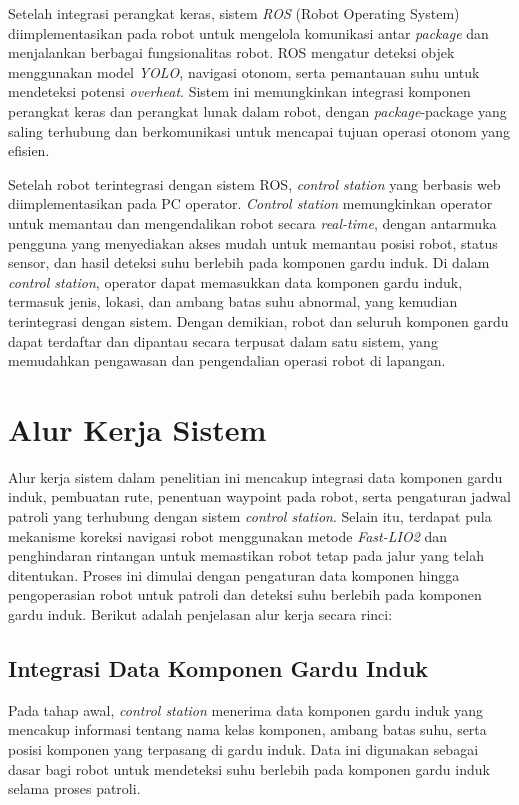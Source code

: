 Setelah integrasi perangkat keras, sistem \emph{ROS} (Robot Operating System) diimplementasikan pada robot untuk mengelola komunikasi antar \textit{package} dan menjalankan berbagai fungsionalitas robot. ROS mengatur deteksi objek menggunakan model \emph{YOLO}, navigasi otonom, serta pemantauan suhu untuk mendeteksi potensi \emph{overheat}. Sistem ini memungkinkan integrasi komponen perangkat keras dan perangkat lunak dalam robot, dengan \emph{package}-package yang saling terhubung dan berkomunikasi untuk mencapai tujuan operasi otonom yang efisien.

Setelah robot terintegrasi dengan sistem ROS, \emph{control station} yang berbasis web diimplementasikan pada PC operator. \emph{Control station} memungkinkan operator untuk memantau dan mengendalikan robot secara \emph{real-time}, dengan antarmuka pengguna yang menyediakan akses mudah untuk memantau posisi robot, status sensor, dan hasil deteksi suhu berlebih pada komponen gardu induk. Di dalam \emph{control station}, operator dapat memasukkan data komponen gardu induk, termasuk jenis, lokasi, dan ambang batas suhu abnormal, yang kemudian terintegrasi dengan sistem. Dengan demikian, robot dan seluruh komponen gardu dapat terdaftar dan dipantau secara terpusat dalam satu sistem, yang memudahkan pengawasan dan pengendalian operasi robot di lapangan.

\section{Alur Kerja Sistem}

Alur kerja sistem dalam penelitian ini mencakup integrasi data komponen gardu induk, pembuatan rute, penentuan waypoint pada robot, serta pengaturan jadwal patroli yang terhubung dengan sistem \emph{control station}. Selain itu, terdapat pula mekanisme koreksi navigasi robot menggunakan metode \emph{Fast-LIO2} dan penghindaran rintangan untuk memastikan robot tetap pada jalur yang telah ditentukan. Proses ini dimulai dengan pengaturan data komponen hingga pengoperasian robot untuk patroli dan deteksi suhu berlebih pada komponen gardu induk. Berikut adalah penjelasan alur kerja secara rinci:

\subsection{Integrasi Data Komponen Gardu Induk}
Pada tahap awal, \emph{control station} menerima data komponen gardu induk yang mencakup informasi tentang nama kelas komponen, ambang batas suhu, serta posisi komponen yang terpasang di gardu induk. Data ini digunakan sebagai dasar bagi robot untuk mendeteksi suhu berlebih pada komponen gardu induk selama proses patroli. 

